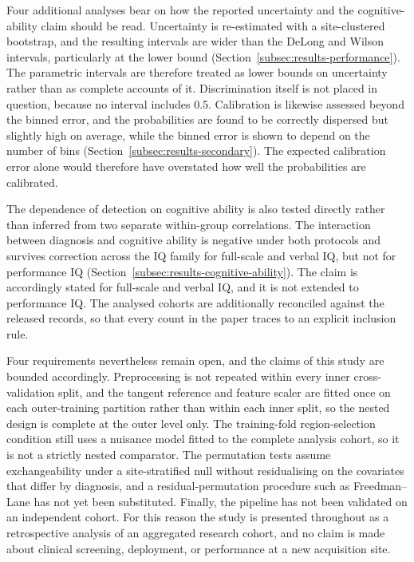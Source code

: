 Four additional analyses bear on how the reported uncertainty and the cognitive-ability claim
should be read. Uncertainty is re-estimated with a site-clustered bootstrap, and the resulting
intervals are wider than the DeLong and Wilson intervals, particularly at the lower bound
(Section~\ref{subsec:results-performance}). The parametric intervals are therefore treated as
lower bounds on uncertainty rather than as complete accounts of it. Discrimination itself is not
placed in question, because no interval includes 0.5. Calibration is likewise assessed beyond the
binned error, and the probabilities are found to be correctly dispersed but slightly high on
average, while the binned error is shown to depend on the number of bins
(Section~\ref{subsec:results-secondary}). The expected calibration error alone would therefore
have overstated how well the probabilities are calibrated.

The dependence of detection on cognitive ability is also tested directly rather than inferred from
two separate within-group correlations. The interaction between diagnosis and cognitive ability is
negative under both protocols and survives correction across the IQ family for full-scale and
verbal IQ, but not for performance IQ (Section~\ref{subsec:results-cognitive-ability}). The claim
is accordingly stated for full-scale and verbal IQ, and it is not extended to performance IQ. The
analysed cohorts are additionally reconciled against the released records, so that every count in
the paper traces to an explicit inclusion rule.

Four requirements nevertheless remain open, and the claims of this study are bounded accordingly.
Preprocessing is not repeated within every inner cross-validation split, and the tangent reference
and feature scaler are fitted once on each outer-training partition rather than within each inner
split, so the nested design is complete at the outer level only. The training-fold region-selection
condition still uses a nuisance model fitted to the complete analysis cohort, so it is not a
strictly nested comparator. The permutation tests assume exchangeability under a site-stratified
null without residualising on the covariates that differ by diagnosis, and a residual-permutation
procedure such as Freedman--Lane has not yet been substituted. Finally, the pipeline has not been
validated on an independent cohort. For this reason the study is presented throughout as a
retrospective analysis of an aggregated research cohort, and no claim is made about clinical
screening, deployment, or performance at a new acquisition site.

